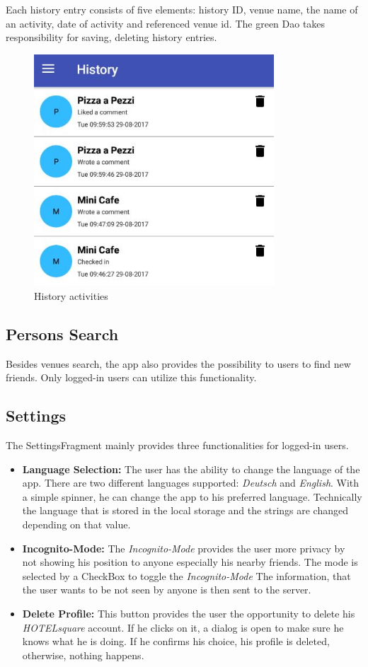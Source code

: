 Each history entry consists of five elements: history ID, venue name, the name of an activity, date of activity and referenced venue id. The green Dao takes responsibility for saving, deleting history entries.
\begin{figure}[htbp]
	\includegraphics[width=0.8\textwidth]{images/history.jpg}
	\centering
	\caption{History activities}\label{fig:history}
\end{figure}

\subsection{Persons Search}
Besides venues search, the app also provides the possibility to users to find new friends. Only logged-in users can utilize this functionality. 
\subsection{Settings}
The SettingsFragment mainly provides three functionalities for logged-in users.

\begin{itemize}
\item \textbf{Language Selection:} The user has the ability to change the language of the app. There are two different languages supported: \textit{Deutsch} and \textit{English}. With a simple spinner, he can change the app to his preferred language. Technically the language that is stored in the local storage and the strings are changed depending on that value.
\item \textbf{Incognito-Mode:} The \textit{Incognito-Mode} provides the user more privacy by not showing his position to anyone especially his nearby friends. The mode is selected by a CheckBox to toggle the \textit{Incognito-Mode} The information, that the user wants to be not seen by anyone is then sent to the server.
\item \textbf{Delete Profile:} This button provides the user the opportunity to delete his \textit{HOTELsquare} account. If he clicks on it, a dialog is open to make sure he knows what he is doing. If he confirms his choice, his profile is deleted, otherwise, nothing happens.
\end{itemize}

